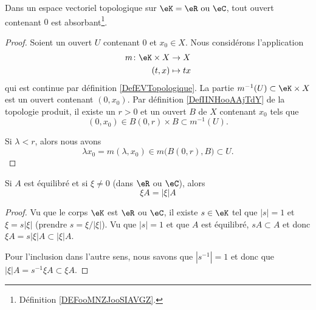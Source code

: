 \begin{lemma}		\label{LEMooEEKYooVCnBMq}
	Dans un espace vectoriel topologique sur \( \eK=\eR\text{ ou }\eC\), tout ouvert contenant \( 0\) est absorbant\footnote{Définition \ref{DEFooMNZJooSIAVGZ}.}.
\end{lemma}

\begin{proof}
	Soient un ouvert \( U\) contenant \( 0\) et \( x_0\in X\). Nous considérons l'application
	\begin{equation}
		\begin{aligned}
			m\colon \eK\times X & \to X      \\
			(t,x)               & \mapsto tx
		\end{aligned}
	\end{equation}
	qui est continue par définition \ref{DefEVTopologique}. La partie \( m^{-1}(U)\subset \eK\times X\) est un ouvert contenant \( (0,x_0)\). Par définition \ref{DefIINHooAAjTdY} de la topologie produit, il existe un \( r>0\) et un ouvert \( B\) de \( X\) contenant \( x_0\) tels que
	\begin{equation}
		(0,x_0)\in B(0,r)\times B\subset m^{-1}(U).
	\end{equation}

	Si \( \lambda< r\), alors nous avons
	\begin{equation}
		\lambda x_0=m(\lambda, x_0)\in m\big( B(0,r),B \big)\subset U.
	\end{equation}
\end{proof}

\begin{lemma}		\label{LEMooKBRIooUAAPXV}
	Si \( A\) est équilibré et si \( \xi\neq 0\) (dans \( \eR\) ou \( \eC\)), alors
	\begin{equation}
		\xi A=| \xi |A
	\end{equation}
\end{lemma}

\begin{proof}
	Vu que le corps \( \eK\) est \( \eR\) ou \( \eC\), il existe \( s\in \eK\) tel que \( | s |=1\) et \( \xi=s| \xi |\) (prendre \( s=\xi/| \xi |\)). Vu que \( | s |=1\) et que \( A\) est équilibré, \( sA\subset A\) et donc \( \xi A=s| \xi |A\subset | \xi |A\).

	Pour l'inclusion dans l'autre sens, nous savons que \( | s^{-1} |=1\) et donc que \( | \xi |A=s^{-1}\xi A\subset \xi A\).
\end{proof}


